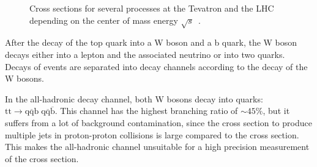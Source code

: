 \begin{figure}[htbp!]
  \begin{center}
\caption{Cross sections for several processes at the Tevatron and the LHC depending on the center of mass energy $\sqrt{s}$~\cite{Olive:2016xmw}.
  \label{fig:theo_xsecs}}
  \end{center}
\end{figure}


After the decay of the top quark into a W boson and a b quark, the W boson decays either into a lepton and the associated neutrino or into two quarks.
Decays of \ttbar events are separated into decay channels according to the decay of the W bosons.

In the all-hadronic decay channel, both W bosons decay into quarks: $\mathrm{tt} \rightarrow \mathrm{q}\overline{\mathrm{q}}\mathrm{b} \; \mathrm{q}\overline{\mathrm{q}}\overline{\mathrm{b}}$. This channel has the highest branching ratio of $\sim 45\%$, but it suffers from a lot of background contamination,
since the cross section to produce multiple jets in proton-proton collisions is large compared to the \ttbar cross section. This makes the all-hadronic channel unsuitable for a high precision measurement of the \ttbar cross section.

